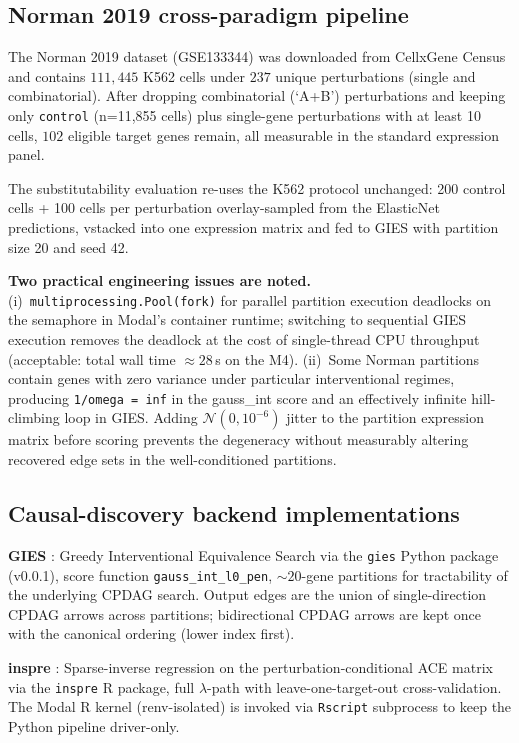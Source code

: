 \documentclass{article}
\theoremstyle{plain}
\theoremstyle{definition}
\theoremstyle{remark}
\begin{document}
\subsection{Norman 2019 cross-paradigm pipeline}
\label{app:norman_pipeline}

The Norman 2019 \citep{norman2019} dataset (GSE133344) was downloaded from CellxGene Census and contains $111{,}445$ K562 cells under $237$ unique perturbations (single and combinatorial). After dropping combinatorial (`A+B') perturbations and keeping only \texttt{control} (n=11{,}855 cells) plus single-gene perturbations with at least 10 cells, $102$ eligible target genes remain, all measurable in the standard expression panel.

The substitutability evaluation re-uses the K562 protocol unchanged: 200 control cells + 100 cells per perturbation overlay-sampled from the ElasticNet predictions, vstacked into one expression matrix and fed to GIES with partition size 20 and seed 42.

\textbf{Two practical engineering issues are noted.} (i)~\texttt{multiprocessing.Pool(fork)} for parallel partition execution deadlocks on the semaphore in Modal's container runtime; switching to sequential GIES execution removes the deadlock at the cost of single-thread CPU throughput (acceptable: total wall time ${\approx}28$\,s on the M4). (ii)~Some Norman partitions contain genes with zero variance under particular interventional regimes, producing \texttt{1/omega = inf} in the gauss\_int score and an effectively infinite hill-climbing loop in GIES. Adding $\mathcal{N}(0, 10^{-6})$ jitter to the partition expression matrix before scoring prevents the degeneracy without measurably altering recovered edge sets in the well-conditioned partitions.

\subsection{Causal-discovery backend implementations}
\label{app:cd_backends}

\textbf{GIES} \citep{hauser2012gies}: Greedy Interventional Equivalence Search via the \texttt{gies} Python package (v0.0.1), score function \texttt{gauss\_int\_l0\_pen}, ${\sim}20$-gene partitions for tractability of the underlying CPDAG search. Output edges are the union of single-direction CPDAG arrows across partitions; bidirectional CPDAG arrows are kept once with the canonical ordering (lower index first).

\textbf{inspre} \citep{brown2025inspre}: Sparse-inverse regression on the perturbation-conditional ACE matrix via the \texttt{inspre} R package, full $\lambda$-path with leave-one-target-out cross-validation. The Modal R kernel (renv-isolated) is invoked via \texttt{Rscript} subprocess to keep the Python pipeline driver-only.
\end{document}
